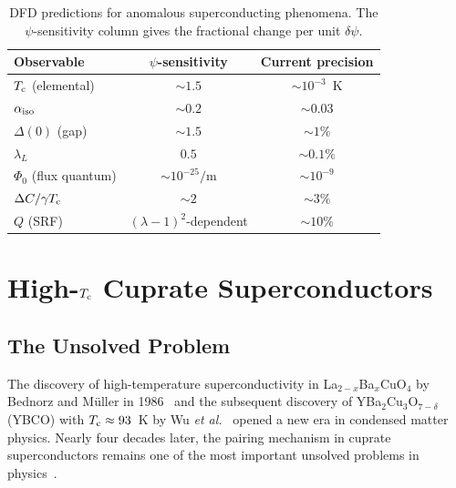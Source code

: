 \documentclass[aps,prb,twocolumn,superscriptaddress,floatfix,nofootinbib,longbibliography]{revtex4-2}
\newcommand{\Tc}{T_{\rm c}}
\begin{document}
\begin{table}[h]
\caption{DFD predictions for anomalous superconducting phenomena.  The
$\psi$-sensitivity column gives the fractional change per unit
$\delta\psi$.}
\label{tab:sc-summary}
\begin{ruledtabular}
\begin{tabular}{lcc}
Observable & $\psi$-sensitivity & Current precision \\
\hline
$\Tc$ (elemental) & $\sim 1.5$ & $\sim 10^{-3}$~K \\
$\alpha_{\rm iso}$ & $\sim 0.2$ & $\sim 0.03$ \\
$\Delta(0)$ (gap) & $\sim 1.5$ & $\sim 1\%$ \\
$\lambda_L$ & $0.5$ & $\sim 0.1\%$ \\
$\Phi_0$ (flux quantum) & $\sim 10^{-25}/\text{m}$ & $\sim 10^{-9}$ \\
$\Delta C/\gamma\Tc$ & $\sim 2$ & $\sim 3\%$ \\
$Q$ (SRF) & $(\lambda-1)^2$-dependent & $\sim 10\%$ \\
\end{tabular}
\end{ruledtabular}
\end{table}

\section{High-$\Tc$ Cuprate Superconductors}\label{sec:highTc}

\subsection{The Unsolved Problem}

The discovery of high-temperature superconductivity in
La$_{2-x}$Ba$_x$CuO$_4$ by Bednorz and M\"uller in
1986~\cite{Bednorz1986} and the subsequent discovery of
YBa$_2$Cu$_3$O$_{7-\delta}$ (YBCO) with $\Tc \approx 93$~K by
Wu \textit{et al.}~\cite{Wu1987} opened a new era in condensed matter
physics.  Nearly four decades later, the pairing mechanism in cuprate
superconductors remains one of the most important unsolved problems in
physics~\cite{Anderson1987,Lee2006,Keimer2015,Proust2019}.
\end{document}
